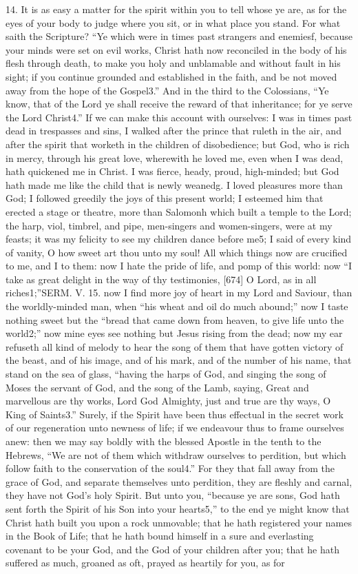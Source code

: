 14. It is as easy a matter for the spirit within you to tell whose ye are, as for the eyes of your body to judge where you sit, or in what place you stand. For what saith the Scripture? “Ye which were in times past strangers and enemiesf, because your minds were set on evil works, Christ hath now reconciled in the body of his flesh through death, to make you holy and unblamable and without fault in his sight; if you continue grounded and established in the faith, and be not moved away from the hope of the Gospel3.” And in the third to the Colossians, “Ye know, that of the Lord ye shall receive the reward of that inheritance; for ye serve the Lord Christ4.” If we can make this account with ourselves: I was in times past dead in trespasses and sins, I walked after the prince that ruleth in the air, and after the spirit that worketh in the children of disobedience; but God, who is rich in mercy, through his great love, wherewith he loved me, even when I was dead, hath quickened me in Christ. I was fierce, heady, proud, high-minded; but God hath made me like the child that is newly weanedg. I loved pleasures more than God; I followed greedily the joys of this present world; I esteemed him that erected a stage or theatre, more than Salomonh which built a temple to the Lord; the harp, viol, timbrel, and pipe, men-singers and women-singers, were at my feasts; it was my felicity to see my children dance before me5; I said of every kind of vanity, O how sweet art thou unto my soul! All which things now are crucified to me, and I to them: now I hate the pride of life, and pomp of this world: now “I take as great delight in the way of thy testimonies, [674] O Lord, as in all riches1;”SERM. V. 15. now I find more joy of heart in my Lord and Saviour, than the worldly-minded man, when “his wheat and oil do much abound;” now I taste nothing sweet but the “bread that came down from heaven, to give life unto the world2;” now mine eyes see nothing but Jesus rising from the dead; now my ear refuseth all kind of melody to hear the song of them that have gotten victory of the beast, and of his image, and of his mark, and of the number of his name, that stand on the sea of glass, “having the harps of God, and singing the song of Moses the servant of God, and the song of the Lamb, saying, Great and marvellous are thy works, Lord God Almighty, just and true are thy ways, O King of Saints3.” Surely, if the Spirit have been thus effectual in the secret work of our regeneration unto newness of life; if we endeavour thus to frame ourselves anew: then we may say boldly with the blessed Apostle in the tenth to the Hebrews, “We are not of them which withdraw ourselves to perdition, but which follow faith to the conservation of the soul4.” For they that fall away from the grace of God, and separate themselves unto perdition, they are fleshly and carnal, they have not God’s holy Spirit. But unto you, “because ye are sons, God hath sent forth the Spirit of his Son into your hearts5,” to the end ye might know that Christ hath built you upon a rock unmovable; that he hath registered your names in the Book of Life; that he hath bound himself in a sure and everlasting covenant to be your God, and the God of your children after you; that he hath suffered as much, groaned as oft, prayed as heartily for you, as for 